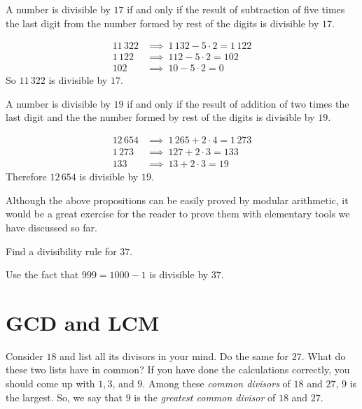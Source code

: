 \begin{proposition}[Divisibility by $17$]
	A number is divisible by $17$ if and only if the result of subtraction of five times the last digit from the number formed by rest of the digits is divisible by $17$.
\end{proposition}

\begin{example}
	\begin{align*}
		11\, 322 & \implies \ 1\, 132 - 5 \cdot 2 = 1\, 122 \\
		1\, 122 & \implies  \ 112 - 5 \cdot 2 =   102 \\
		102 & \implies \ 10 - 5 \cdot 2 =  0
	\end{align*}
	So $11\, 322$ is divisible by $17$.
\end{example}

\begin{proposition}[Divisibility by $19$]
	A number is divisible by $19$ if and only if the result of addition of two times the last digit and the the number formed by rest of the digits is divisible by $19$.
\end{proposition}

\begin{example}
	\begin{align*}
		12 \, 654 & \implies \ 1\, 265 + 2 \cdot 4 = 1\, 273 \\
		1\, 273 & \implies  \ 127 + 2 \cdot 3 =   133 \\
		133 & \implies \ 13 + 2 \cdot 3 =  19
	\end{align*}
	Therefore $12\, 654$ is divisible by $19$.
\end{example}

Although the above propositions can be easily proved by modular arithmetic, it would be a great exercise for the reader to prove them with elementary tools we have discussed so far.

\begin{problem}
	Find a divisibility rule for $37$.
\end{problem}

\begin{hint}
	Use the fact that $999=1000-1$ is divisible by $37$.
\end{hint}

\section{GCD and LCM}\label{sec:gcd-lcm}
Consider $18$ and list all its divisors in your mind. Do the same for $27$. What do these two lists have in common? If you have done the calculations correctly, you should come up with $1,3$, and $9$. Among these \textit{common divisors} of $18$ and $27$, $9$ is the largest. So, we say that $9$ is the \textit{greatest common divisor} of $18$ and $27$.

